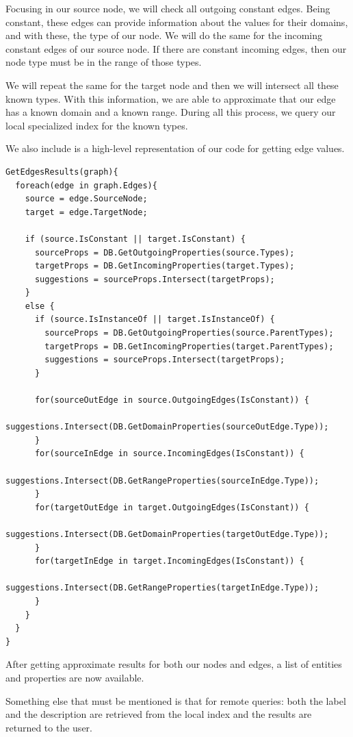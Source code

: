 \begin{example}
Focusing in our source node, we will check all outgoing constant edges. Being constant, these edges can provide information about the values for their domains, and with these, the type of our node. We will do the same for the incoming constant edges of our source node. If there are constant incoming edges, then our node type must be in the range of those types.

We will repeat the same for the target node and then we will intersect all these known types. With this information, we are able to approximate that our edge has a known domain and a known range. During all this process, we query our local specialized index for the known types.

We also include is a high-level representation of our code for getting edge values.

\begin{verbatim}
GetEdgesResults(graph){
  foreach(edge in graph.Edges){
    source = edge.SourceNode;
    target = edge.TargetNode;

    if (source.IsConstant || target.IsConstant) {
      sourceProps = DB.GetOutgoingProperties(source.Types);
      targetProps = DB.GetIncomingProperties(target.Types);
      suggestions = sourceProps.Intersect(targetProps);
    }
    else {
      if (source.IsInstanceOf || target.IsInstanceOf) {
        sourceProps = DB.GetOutgoingProperties(source.ParentTypes);
        targetProps = DB.GetIncomingProperties(target.ParentTypes);
        suggestions = sourceProps.Intersect(targetProps);
      }

      for(sourceOutEdge in source.OutgoingEdges(IsConstant)) {
        suggestions.Intersect(DB.GetDomainProperties(sourceOutEdge.Type));
      }
      for(sourceInEdge in source.IncomingEdges(IsConstant)) {
        suggestions.Intersect(DB.GetRangeProperties(sourceInEdge.Type));
      }
      for(targetOutEdge in target.OutgoingEdges(IsConstant)) {
        suggestions.Intersect(DB.GetDomainProperties(targetOutEdge.Type));
      }
      for(targetInEdge in target.IncomingEdges(IsConstant)) {
        suggestions.Intersect(DB.GetRangeProperties(targetInEdge.Type));
      }
    }
  }
}
\end{verbatim}

\end{example}

After getting approximate results for both our nodes and edges, a list of entities and properties are now available. 

Something else that must be mentioned is that for remote queries: both the label and the description are retrieved from the local index and the results are returned to the user. 

